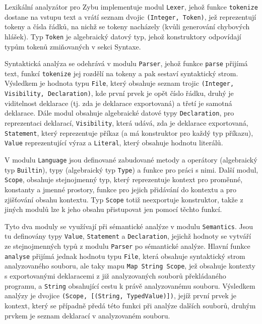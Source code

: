 \documentclass[a4paper,12pt]{article}
\begin{document}
Lexikální analyzátor pro Zybu implementuje modul \texttt{Lexer}, jehož funkce \texttt{tokenize} dostane na vstupu text a vrátí seznam dvojic \texttt{(Integer, Token)}, jež reprezentují tokeny a čísla řádků, na nichž se tokeny nacházely (kvůli generování chybových hlášek). Typ \texttt{Token} je algebraický datový typ, jehož konstruktory odpovídají typům tokenů zmiňovaných v sekci Syntaxe.

Syntaktická analýza se odehrává v modulu \texttt{Parser}, jehož funkce \texttt{parse} přijímá text, funkcí \texttt{tokenize} jej rozdělí na tokeny a pak sestaví syntaktický strom. Výsledkem je hodnota typu \texttt{File}, který obsahuje seznam trojic \texttt{(Integer, Visibility, Declaration)}, kde první prvek je opět číslo řádku, druhý je viditelnost deklarace (tj. zda je deklarace exportovaná) a třetí je samotná deklarace. Dále modul obsahuje algebraické datové typy \texttt{Declaration}, pro reprezentaci deklarací, \texttt{Visibility}, která udává, zda je deklarace exportovaná, \texttt{Statement}, který reprezentuje příkaz (a má konstruktor pro každý typ příkazu), \texttt{Value} reprezentující výraz a \texttt{Literal}, který obsahuje hodnotu literálů.

V modulu \texttt{Language} jsou definované zabudované metody a operátory (algebraický typ \texttt{Builtin}), typy (algebraický typ \texttt{Type}) a funkce pro práci s nimi. Další modul, \texttt{Scope}, obsahuje stejnojmenný typ, který reprezentuje kontext pro proměnné, konstanty a jmenné prostory, funkce pro jejich přidávání do kontextu a pro zjišťování obsahu kontextu. Typ \texttt{Scope} totiž neexportuje konstruktor, takže z jiných modulů lze k jeho obsahu přistupovat jen pomocí těchto funkcí.

Tyto dva moduly se využívají při sémantické analýze v modulu \texttt{Semantics}. Jsou tu definovány typy \texttt{Value}, \texttt{Statement} a \texttt{Declaration}, jejichž hodnoty se vytváří ze stejnojmenných typů z modulu \texttt{Parser} po sémantické analýze. Hlavní funkce \texttt{analyse} přijímá jednak hodnotu typu \texttt{File}, která obsahuje syntaktický strom analyzovaného souboru, ale taky mapu \texttt{Map String Scope}, jež obsahuje kontexty s exportovanými deklaracemi z již analyzovaných souborů překládaného programu, a \texttt{String} obsahující cestu k právě analyzovanému souboru. Výsledkem analýzy je dvojice \texttt{(Scope, [(String, TypedValue)])}, jejíž první prvek je kontext, který se případně předá této funkci při analýze dalších souborů, druhým prvkem je seznam deklarací v analyzovaném souboru. 
\end{document}

